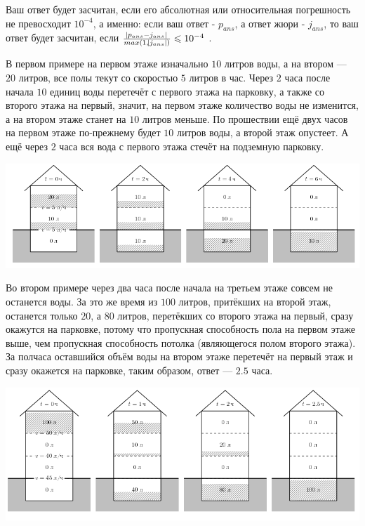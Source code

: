 \begin{problem}
Ваш ответ будет засчитан, если его абсолютная или относительная погрешность не превосходит $10^{-4}$, а именно: если ваш ответ - $p_{ans}$, а ответ жюри - $j_{ans}$, то ваш ответ будет засчитан, если $\frac{\abs{p_{ans} - j_{ans}}}{max(1, \abs{j_{ans}})} \leqslant 10^{-4}$ .

\Examples

\begin{example}
%
%
\end{example}

\Explanation

В первом примере на первом этаже изначально $10$ литров воды, а на втором — $20$ литров, все полы текут со скоростью $5$ литров в час. Через $2$ часа после начала $10$ единиц воды перетечёт с первого этажа на парковку, а также со второго этажа на первый, значит, на первом этаже количество воды не изменится, а на втором этаже станет на $10$ литров меньше. По прошествии ещё двух часов на первом этаже по-прежнему будет $10$ литров воды, а второй этаж опустеет. А ещё через $2$ часа вся вода с первого этажа стечёт на подземную парковку.

\begin{center}
\begin{adjustbox}{max size={\textwidth}{\textheight}}
\includegraphics{images/2966.png}
\end{adjustbox}
\end{center}

Во втором примере через два часа после начала на третьем этаже совсем не останется воды. За это же время из $100$ литров, притёкших на второй этаж, останется только $20$, а $80$ литров, перетёкших со второго этажа на первый, сразу окажутся на парковке, потому что пропускная способность пола на первом этаже выше, чем пропускная способность потолка (являющегося полом второго этажа). За полчаса оставшийся объём воды на втором этаже перетечёт на первый этаж и сразу окажется на парковке, таким образом, ответ — $2.5$ часа.

\begin{center}
\begin{adjustbox}{max size={\textwidth}{\textheight}}
\includegraphics{images/2967.png}
\end{adjustbox}
\end{center}

\end{problem}